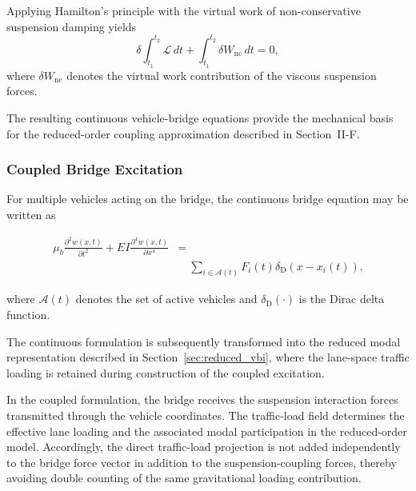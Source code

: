 \documentclass[journal]{IEEEtran}
\begin{document}
Applying Hamilton's principle with the virtual
work of non-conservative suspension damping yields
\begin{equation}
\delta\int_{t_1}^{t_2}\mathcal{L}\,dt
+
\int_{t_1}^{t_2}\delta W_{\mathrm{nc}}\,dt
=0,
\label{eq:hamilton_vbi}
\end{equation}
where $\delta W_{\mathrm{nc}}$ denotes the
virtual work contribution of the viscous
suspension forces.

The resulting continuous vehicle-bridge equations
provide the mechanical basis for the reduced-order
coupling approximation described in Section~II-F.




\subsubsection{Coupled Bridge Excitation}

For multiple vehicles acting on the bridge, the continuous bridge
equation may be written as

\begin{equation}
\begin{aligned}
\mu_b
\frac{\partial^2 w(x,t)}{\partial t^2}
+
EI
\frac{\partial^4 w(x,t)}{\partial x^4}
&=
\\[-0.2em]
&\quad
\sum_{i\in\mathcal{A}(t)}
F_i(t)
\delta_{\mathrm{D}}
\left(
x-x_i(t)
\right).
\end{aligned}
\end{equation}

where $\mathcal{A}(t)$ denotes the set of active vehicles and $\delta_{\mathrm{D}}(\cdot)$ is the Dirac delta function.

The continuous formulation is subsequently transformed into the reduced
modal representation described in Section~\ref{sec:reduced_vbi}, where the lane-space traffic
loading is retained during construction of the coupled excitation.

In the coupled formulation, the bridge receives the suspension
interaction forces transmitted through the vehicle coordinates.
The traffic-load field determines the effective lane loading and
the associated modal participation in the reduced-order model.
Accordingly, the direct traffic-load projection is not added
independently to the bridge force vector in addition to the
suspension-coupling forces, thereby avoiding double counting
of the same gravitational loading contribution.
\end{document}
